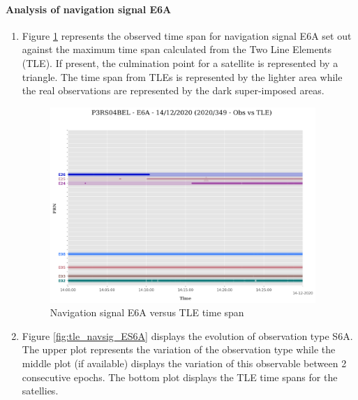 \paragraph{Analysis of navigation signal E6A}%
\label{para:AnalysisofnavigationsignalE6A}%
\newpage%
\begin{enumerate}%
\item%
Figure \ref{fig:tle_navsig_6AE} represents the observed time span for navigation signal E6A set out against the maximum time span calculated from the  Two Line Elements (TLE). If present, the culmination point for a satellite is represented by a triangle. The time span from TLEs is represented by the lighter area while the real observations are represented by the dark super-imposed areas.%


\begin{figure}[H]%
\centering%
\includegraphics[width=0.95\textwidth]{png/P3RS04BEL_R_20203490000_01D_00U_MO_E-E6A-TLE-arcs.png}%
\caption{\label{fig:tle_navsig_6AE} Navigation signal E6A versus TLE time span}%
\end{figure}

%
\item%
Figure \ref{fig:tle_navsig_ES6A} displays the evolution of observation type S6A. \newline The upper plot represents the variation of the observation type while the middle plot (if available) displays the variation of this observable between 2 consecutive epochs. The bottom plot displays the TLE time spans for the satellies.%



\end{enumerate}

